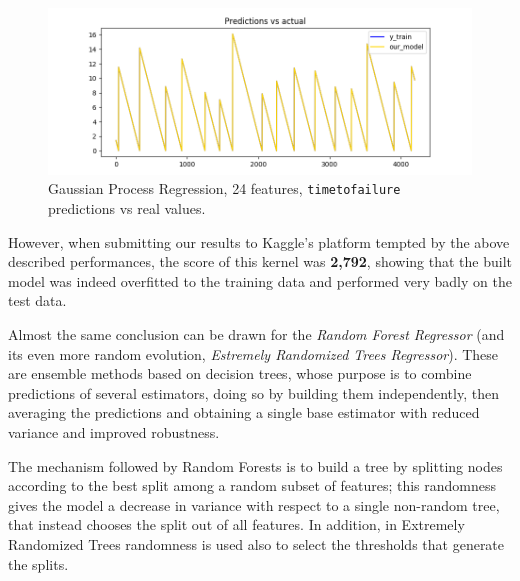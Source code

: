 \begin{figure} [h]
	\centering
	\includegraphics[width=1\linewidth]{pictures/gpr_24f.png}
	\caption{Gaussian Process Regression, 24 features, \texttt{time\textunderscore to\textunderscore failure} predictions vs real values.}
	\label{fig:GP}
\end{figure}

However, when submitting our results to Kaggle's platform tempted by the above described performances, the score of this kernel was \textbf{2,792}, showing that the built model was indeed overfitted to the training data and performed very badly on the test data.



\bigbreak

Almost the same conclusion can be drawn for the \textit{Random Forest Regressor} (and its even more random evolution, \textit{Estremely Randomized Trees Regressor}). These are ensemble methods based on decision trees, whose purpose is to combine predictions of several estimators, doing so by building them independently, then averaging the predictions and obtaining a single base estimator with reduced variance and improved robustness.

The mechanism followed by Random Forests is to build a tree by splitting nodes according to the best split among a random subset of features; this randomness gives the model a decrease in variance with respect to a single non-random tree, that instead chooses the split out of all features. In addition, in Extremely Randomized Trees randomness is used also to select the thresholds that generate the splits.

